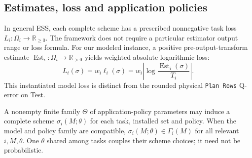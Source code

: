 \documentclass[sigconf, nonacm]{acmart}
\begin{document}
\subsection{Estimates, loss and application policies}
In general ESS, each complete scheme has a prescribed
nonnegative task loss \(L_i:\Omega_i\to\mathbb R_{\geq0}\).
The framework does not require a particular estimator
output range or loss formula. For our modeled instance,
a positive pre-output-transform estimate
\(\operatorname{Est}_i:\Omega_i\to\mathbb R_{>0}\)
yields weighted absolute logarithmic loss:
\begin{equation}
\label{eq:loss}
L_i(\sigma)=w_i\ell_i(\sigma)
=w_i\left|\log\frac{\operatorname{Est}_i(\sigma)}{T_i}\right|.
\end{equation}
This instantiated model loss is distinct from the
rounded physical \texttt{Plan Rows} Q-error on Test.

A nonempty finite family \(\Theta\) of application-policy parameters
may induce a complete scheme \(\sigma_i(M;\theta)\) for each task,
installed set and policy. When the model and policy family are
compatible, \(\sigma_i(M;\theta)\in\Gamma_i(M)\) for all
relevant \(i,M,\theta\). One \(\theta\) shared among tasks couples their
scheme choices; it need not be probabilistic.
\end{document}
